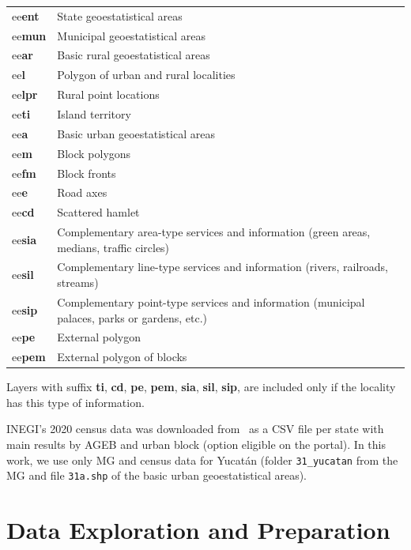 \begin{table}[htpb]
  \centering
  \label{tab:MG_filenames}
  \footnotesize
  \begin{tabular}{ l l }
    ee\textbf{ent} & State geoestatistical areas \\
    ee\textbf{mun} & Municipal geoestatistical areas \\
    ee\textbf{ar} & Basic rural geoestatistical areas \\
    ee\textbf{l} & Polygon of urban and rural localities \\
    ee\textbf{lpr} & Rural point locations \\
    ee\textbf{ti} & Island territory\\
    ee\textbf{a} & Basic urban geoestatistical areas \\
    ee\textbf{m} & Block polygons\\
    ee\textbf{fm} & Block fronts \\
    ee\textbf{e} & Road axes \\
    ee\textbf{cd} & Scattered hamlet \\
    ee\textbf{sia} & Complementary area-type services and information (green areas, medians, traffic circles) \\
    ee\textbf{sil} & Complementary line-type services and information
                     (rivers, railroads, streams) \\
    ee\textbf{sip} & Complementary point-type services and information
                     (municipal palaces, parks or gardens, etc.) \\
    ee\textbf{pe} & External polygon \\
    ee\textbf{pem} & External polygon of blocks \\
  \end{tabular}
\end{table}

Layers with suffix \textbf{ti}, \textbf{cd}, \textbf{pe}, \textbf{pem}, \textbf{sia}, \textbf{sil}, \textbf{sip}, are included only if the locality has this type of information.

INEGI's 2020 census data was downloaded from~\cite{2020census} as a CSV file per state with main results by AGEB and urban block (option eligible on the portal). In this work, we use only MG and census data for Yucatán (folder \verb|31_yucatan| from the MG and file \verb|31a.shp| of the basic urban geoestatistical areas).

\section{Data Exploration and Preparation}


